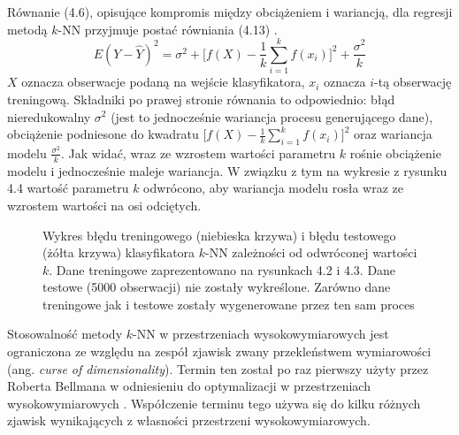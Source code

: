 \documentclass[notitlepage]{report}
\begin{document}
Równanie (4.6), opisujące kompromis między obciążeniem i wariancją, dla regresji metodą $k$-NN przyjmuje postać równiania (4.13) \cite{eslii}.
\begin{equation}
E(Y-\hat{Y})^2 = \sigma^2 + \big[f(X) - \frac{1}{k}\sum_{i=1}^{k}f(x_i)\big]^2 + \frac{\sigma^2}{k}
\end{equation}
$X$ oznacza obserwacje podaną na wejście klasyfikatora, $x_i$ oznacza $i$-tą  obserwację treningową. Składniki po prawej stronie równania to odpowiednio: błąd nieredukowalny $\sigma^2$ (jest to jednocześnie wariancja procesu generującego dane), obciążenie podniesone do kwadratu $\big[f(X) - \frac{1}{k}\sum_{i=1}^{k}f(x_i)\big]^2$ oraz wariancja modelu $\frac{\sigma^2}{k}$. Jak widać, wraz ze wzrostem wartości parametru $k$ rośnie obciążenie modelu i jednocześnie maleje wariancja. W związku z tym na wykresie z rysunku 4.4 wartość parametru $k$ odwrócono, aby wariancja modelu rosła wraz ze wzrostem wartości na osi odciętych.

\begin{figure}[H]
	\centering
	\caption{Wykres błędu treningowego (niebieska krzywa) i błędu testowego (żółta krzywa) klasyfikatora $k$-NN zależności od odwróconej wartości $k$. Dane treningowe zaprezentowano na rysunkach 4.2 i 4.3. Dane testowe (5000 obserwacji) nie zostały wykreślone. Zarówno dane treningowe jak i testowe zostały wygenerowane przez ten sam proces \cite{islr}}
\end{figure}

Stosowalność metody $k$-NN w przestrzeniach wysokowymiarowych jest ograniczona ze względu na zespół zjawisk zwany przekleństwem wymiarowości (ang. \textit{curse of dimensionality}). Termin ten został po raz pierwszy użyty przez Roberta Bellmana w odniesieniu do optymalizacji w przestrzeniach wysokowymiarowych \cite{bellman}. Współczenie terminu tego używa się do kilku różnych zjawisk wynikających z własności przestrzeni wysokowymiarowych.
\end{document}
